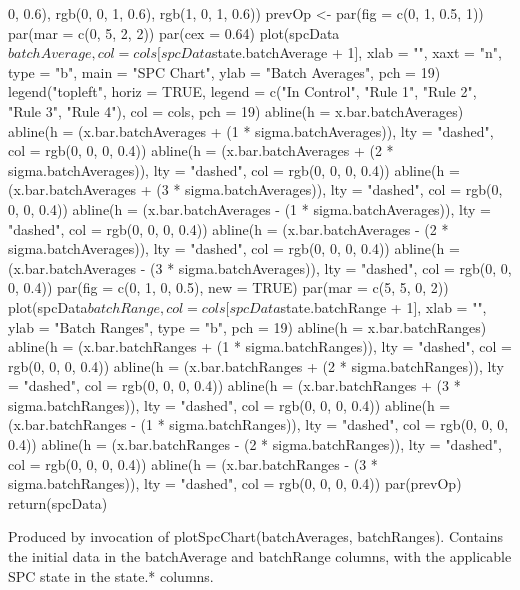 \documentclass[a4paper]{book}
\begin{document}
\begin{Examples}
\begin{ExampleCode}
{        0, 0.6), rgb(0, 0, 1, 0.6), rgb(1, 0, 1, 0.6))
    prevOp <- par(fig = c(0, 1, 0.5, 1))
    par(mar = c(0, 5, 2, 2))
    par(cex = 0.64)
    plot(spcData$batchAverage, col = cols[spcData$state.batchAverage + 
        1], xlab = "", xaxt = "n", type = "b", main = "SPC Chart", 
        ylab = "Batch Averages", pch = 19)
    legend("topleft", horiz = TRUE, legend = c("In Control", 
        "Rule 1", "Rule 2", "Rule 3", "Rule 4"), col = cols, 
        pch = 19)
    abline(h = x.bar.batchAverages)
    abline(h = (x.bar.batchAverages + (1 * sigma.batchAverages)), 
        lty = "dashed", col = rgb(0, 0, 0, 0.4))
    abline(h = (x.bar.batchAverages + (2 * sigma.batchAverages)), 
        lty = "dashed", col = rgb(0, 0, 0, 0.4))
    abline(h = (x.bar.batchAverages + (3 * sigma.batchAverages)), 
        lty = "dashed", col = rgb(0, 0, 0, 0.4))
    abline(h = (x.bar.batchAverages - (1 * sigma.batchAverages)), 
        lty = "dashed", col = rgb(0, 0, 0, 0.4))
    abline(h = (x.bar.batchAverages - (2 * sigma.batchAverages)), 
        lty = "dashed", col = rgb(0, 0, 0, 0.4))
    abline(h = (x.bar.batchAverages - (3 * sigma.batchAverages)), 
        lty = "dashed", col = rgb(0, 0, 0, 0.4))
    par(fig = c(0, 1, 0, 0.5), new = TRUE)
    par(mar = c(5, 5, 0, 2))
    plot(spcData$batchRange, col = cols[spcData$state.batchRange + 
        1], xlab = "", ylab = "Batch Ranges", type = "b", pch = 19)
    abline(h = x.bar.batchRanges)
    abline(h = (x.bar.batchRanges + (1 * sigma.batchRanges)), 
        lty = "dashed", col = rgb(0, 0, 0, 0.4))
    abline(h = (x.bar.batchRanges + (2 * sigma.batchRanges)), 
        lty = "dashed", col = rgb(0, 0, 0, 0.4))
    abline(h = (x.bar.batchRanges + (3 * sigma.batchRanges)), 
        lty = "dashed", col = rgb(0, 0, 0, 0.4))
    abline(h = (x.bar.batchRanges - (1 * sigma.batchRanges)), 
        lty = "dashed", col = rgb(0, 0, 0, 0.4))
    abline(h = (x.bar.batchRanges - (2 * sigma.batchRanges)), 
        lty = "dashed", col = rgb(0, 0, 0, 0.4))
    abline(h = (x.bar.batchRanges - (3 * sigma.batchRanges)), 
        lty = "dashed", col = rgb(0, 0, 0, 0.4))
    par(prevOp)
    return(spcData)
  }
\end{ExampleCode}
\end{Examples}
%
\begin{Description}\relax
Produced by invocation of plotSpcChart(batchAverages, batchRanges).
Contains the initial data in the batchAverage and batchRange columns, with the applicable SPC state in the state.* columns.	
\end{Description}
\end{document}
